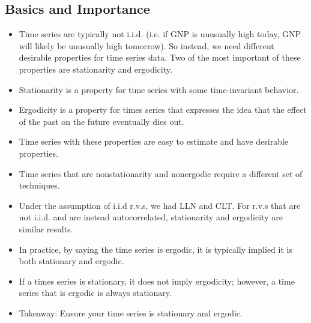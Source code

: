 \documentclass[11pt]{article}
\begin{document}
\subsection{Basics and Importance}
\begin{itemize}
    \item Time series are typically not i.i.d. (i.e. if GNP is unusually high today, GNP will 
    likely be unusually high tomorrow). So instead, we need different desirable properties for 
    time series data. Two of the most important of these properties are stationarity and 
    ergodicity. 
    \item Stationarity is a property for time series with some time-invariant behavior.
    \item Ergodicity is a property for times series that expresses the idea that the effect of 
    the past on the future eventually dies out.
    \item Time series with these properties are easy to estimate and have desirable properties.
    \item Time series that are nonstationarity and nonergodic require a different set of
    techniques.
    \item Under the assumption of i.i.d r.v.s, we had LLN and CLT. For r.v.s that are not 
    i.i.d. and are instead autocorrelated, stationarity and ergodicity are similar results.
    \item In practice, by saying the time series is ergodic, it is typically implied it is both
    stationary and ergodic. 
    \item If a times series is stationary, it does not imply ergodicity; however, a time series 
    that is ergodic is always stationary.
    \item Takeaway: Ensure your time series is stationary and ergodic. 
\end{itemize}
\end{document}
